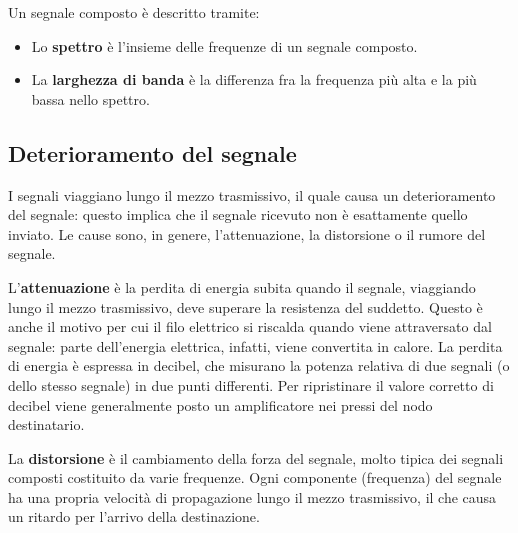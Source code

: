         \vspace{3mm}
        
        Un segnale composto è descritto tramite:
        
        \begin{itemize}
            \item
                Lo \textbf{spettro} è l'insieme delle frequenze di un segnale composto.
            
            \item
                La \textbf{larghezza di banda} è la differenza fra la frequenza più alta e la più bassa nello spettro.
        \end{itemize}
    
    \subsection{Deterioramento del segnale}
    
        I segnali viaggiano lungo il mezzo trasmissivo, il quale causa un deterioramento del segnale: questo implica che il segnale ricevuto non è esattamente quello inviato. Le cause sono, in genere, l'attenuazione, la distorsione o il rumore del segnale.
        
        \vspace{3mm}
        
        L'\textbf{attenuazione} è la perdita di energia subita quando il segnale, viaggiando lungo il mezzo trasmissivo, deve superare la resistenza del suddetto. Questo è anche il motivo per cui il filo elettrico si riscalda quando viene attraversato dal segnale: parte dell'energia elettrica, infatti, viene convertita in calore. La perdita di energia è espressa in decibel, che misurano la potenza relativa di due segnali (o dello stesso segnale) in due punti differenti. Per ripristinare il valore corretto di decibel viene generalmente posto un amplificatore nei pressi del nodo destinatario.
        
        \vspace{3mm}
        
        La \textbf{distorsione} è il cambiamento della forza del segnale, molto tipica dei segnali composti costituito da varie frequenze. Ogni componente (frequenza) del segnale ha una propria velocità di propagazione lungo il mezzo trasmissivo, il che causa un ritardo per l'arrivo della destinazione.
        
        \vspace{3mm}
        
